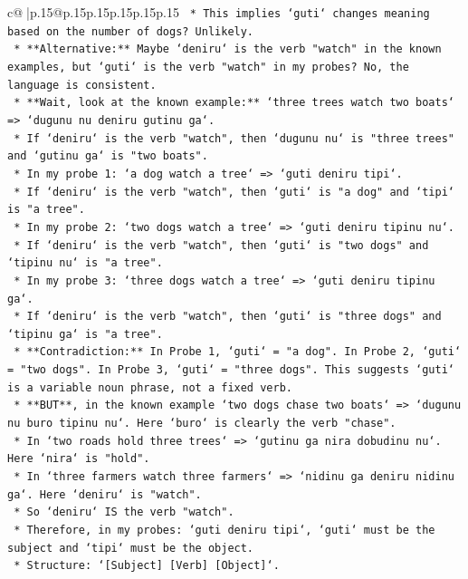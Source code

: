 \documentclass{article}
\begin{document}
{\begin{supertabular}{c@{$\;$}|p{.15\linewidth}@{}p{.15\linewidth}p{.15\linewidth}p{.15\linewidth}p{.15\linewidth}p{.15\linewidth}}
{{{\texttt{    *   This implies `guti` changes meaning based on the number of dogs? Unlikely.} \\
\texttt{    *   **Alternative:** Maybe `deniru` is the verb "watch" in the known examples, but `guti` is the verb "watch" in my probes? No, the language is consistent.} \\
\texttt{    *   **Wait, look at the known example:** `three trees watch two boats` => `dugunu nu deniru gutinu ga`.} \\
\texttt{        *   If `deniru` is the verb "watch", then `dugunu nu` is "three trees" and `gutinu ga` is "two boats".} \\
\texttt{        *   In my probe 1: `a dog watch a tree` => `guti deniru tipi`.} \\
\texttt{        *   If `deniru` is the verb "watch", then `guti` is "a dog" and `tipi` is "a tree".} \\
\texttt{        *   In my probe 2: `two dogs watch a tree` => `guti deniru tipinu nu`.} \\
\texttt{        *   If `deniru` is the verb "watch", then `guti` is "two dogs" and `tipinu nu` is "a tree".} \\
\texttt{        *   In my probe 3: `three dogs watch a tree` => `guti deniru tipinu ga`.} \\
\texttt{        *   If `deniru` is the verb "watch", then `guti` is "three dogs" and `tipinu ga` is "a tree".} \\
\texttt{    *   **Contradiction:** In Probe 1, `guti` = "a dog". In Probe 2, `guti` = "two dogs". In Probe 3, `guti` = "three dogs". This suggests `guti` is a variable noun phrase, not a fixed verb.} \\
\texttt{    *   **BUT**, in the known example `two dogs chase two boats` => `dugunu nu buro tipinu nu`. Here `buro` is clearly the verb "chase".} \\
\texttt{    *   In `two roads hold three trees` => `gutinu ga nira dobudinu nu`. Here `nira` is "hold".} \\
\texttt{    *   In `three farmers watch three farmers` => `nidinu ga deniru nidinu ga`. Here `deniru` is "watch".} \\
\texttt{    *   So `deniru` IS the verb "watch".} \\
\texttt{    *   Therefore, in my probes: `guti deniru tipi`, `guti` must be the subject and `tipi` must be the object.} \\
\texttt{    *   Structure: `{[}Subject{]} {[}Verb{]} {[}Object{]}`.} \\
}}}
\end{supertabular}}
\end{document}

